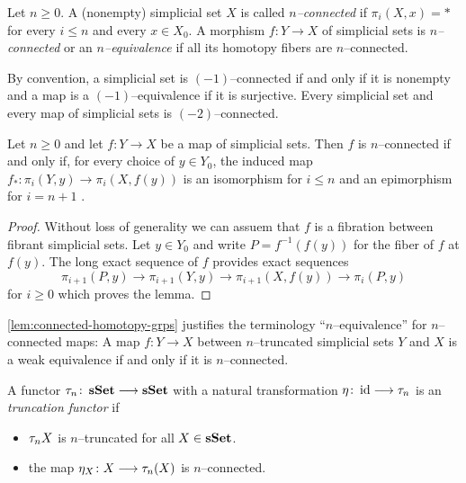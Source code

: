\begin{definition}\label{defn:connect_simp}
  Let \(n\geq 0\). A (nonempty) simplicial set \(X\) is called
  \emph{\(n\)--connected} if \(\pi_i(X,x) = *\) for every \(i\leq n\)
  and every \(x\in X_{0}\). A morphism \(f\colon Y\to X\) of
  simplicial sets is \emph{\(n\)--connected} or an
  \emph{\(n\)--equivalence} if all its homotopy fibers are
  \(n\)--connected.

  By convention, a simplicial set is \((-1)\)--connected if and only
  if it is nonempty and a map is a \((-1)\)--equivalence if it is
  surjective. Every simplicial set and every map of simplicial sets is
  \((-2)\)--connected.
\end{definition}

\begin{lemma}\label{lem:connected-homotopy-grps}
  Let \(n\geq 0\) and let \(f\colon Y\to X\) be a map of simplicial
  sets. Then \(f\) is \(n\)--connected if and only if, for every
  choice of \(y\in Y_{0}\), the induced map
  \(f_{*}\colon \pi_i(Y,y)\to\pi_{i}(X,f(y))\) is an isomorphism for
  \(i \leq n\) and an epimorphism for \(i = n+1\) .
\end{lemma}
\begin{proof}
  Without loss of generality we can assuem that \(f\) is a fibration
  between fibrant simplicial sets. Let \(y\in Y_{0}\) and write
  \(P = f^{-1}(f(y))\) for the fiber of \(f\) at \(f(y)\). The long
  exact sequence of \(f\) provides exact sequences
\[
  \pi_{i+1}(P,y) \to \pi_{i+1}(Y, y) \to \pi_{i+1}(X,f(y)) \to
  \pi_{i}(P,y)
\]
for \(i\geq 0\) which proves the lemma.
\end{proof}

\begin{remark}
  \autoref{lem:connected-homotopy-grps} justifies the terminology
  \enquote{\(n\)--equivalence} for \(n\)--connected maps: A map
  \(f\colon Y\to X\) between \(n\)--truncated simplicial sets \(Y\)
  and \(X\) is a weak equivalence if and only if it is \(n\)--connected.
\end{remark}

\begin{definition}\label{defn:trunc_functor}
  A functor \(\tau_{n}\colon \operatorname{\textnormal{\bfseries sSet}} \longrightarrow \operatorname{\textnormal{\bfseries sSet}}\) with a natural
  transformation \(\eta\colon \operatorname{\textnormal{id}}\longrightarrow\tau_{n}\) is an \emph{
    truncation functor} if
  \begin{itemize}
  \item \(\tau_{n}X\) is \(n\)--truncated for all \(X\in\operatorname{\textnormal{\bfseries sSet}}\).
  \item the map \(\eta_X\colon X\longrightarrow\tau_{n}(X)\) is \(n\)--connected.
  \end{itemize}
\end{definition}

